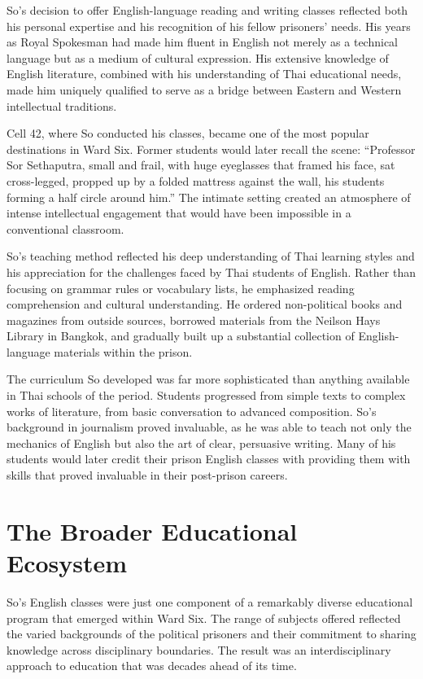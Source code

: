 \documentclass[
  Letterpaper,
]{scrbook}
\begin{document}
So's decision to offer English-language reading and writing classes
reflected both his personal expertise and his recognition of his fellow
prisoners' needs. His years as Royal Spokesman had made him fluent in
English not merely as a technical language but as a medium of cultural
expression. His extensive knowledge of English literature, combined with
his understanding of Thai educational needs, made him uniquely qualified
to serve as a bridge between Eastern and Western intellectual
traditions.

Cell 42, where So conducted his classes, became one of the most popular
destinations in Ward Six. Former students would later recall the scene:
``Professor Sor Sethaputra, small and frail, with huge eyeglasses that
framed his face, sat cross-legged, propped up by a folded mattress
against the wall, his students forming a half circle around him.'' The
intimate setting created an atmosphere of intense intellectual
engagement that would have been impossible in a conventional classroom.

So's teaching method reflected his deep understanding of Thai learning
styles and his appreciation for the challenges faced by Thai students of
English. Rather than focusing on grammar rules or vocabulary lists, he
emphasized reading comprehension and cultural understanding. He ordered
non-political books and magazines from outside sources, borrowed
materials from the Neilson Hays Library in Bangkok, and gradually built
up a substantial collection of English-language materials within the
prison.

The curriculum So developed was far more sophisticated than anything
available in Thai schools of the period. Students progressed from simple
texts to complex works of literature, from basic conversation to
advanced composition. So's background in journalism proved invaluable,
as he was able to teach not only the mechanics of English but also the
art of clear, persuasive writing. Many of his students would later
credit their prison English classes with providing them with skills that
proved invaluable in their post-prison careers.

\section{The Broader Educational
Ecosystem}\label{the-broader-educational-ecosystem}

So's English classes were just one component of a remarkably diverse
educational program that emerged within Ward Six. The range of subjects
offered reflected the varied backgrounds of the political prisoners and
their commitment to sharing knowledge across disciplinary boundaries.
The result was an interdisciplinary approach to education that was
decades ahead of its time.
\end{document}
